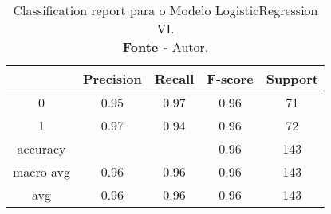 % 
\begin{table}[H]
    \centering
    \begin{tabular}{@{}ccccc@{}}
    \toprule
     & \textbf{Precision} & \textbf{Recall} &\textbf{F-score} & \textbf{Support} \\ \midrule 
    0 & 0.95 & 0.97 & 0.96 & 71 \\ 
    1 & 0.97 & 0.94 & 0.96 & 72 \\ 
    accuracy &  &  & 0.96 & 143 \\ 
    macro avg & 0.96 & 0.96 & 0.96 & 143 \\ 
    avg & 0.96 & 0.96 & 0.96 & 143 \\ \bottomrule 
    \end{tabular}
    \caption{Classification report para o Modelo LogisticRegression VI. \\ \textbf{Fonte -} Autor.}
    \label{tab: classification-report-Modelo LogisticRegression VI}
\end{table}